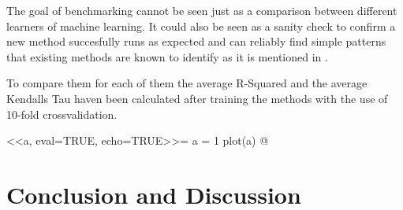 \documentclass[a4paper]{article}
\begin{document}
The goal of benchmarking cannot be seen just as a comparison between different learners of machine learning.
It could also be seen as a sanity check to confirm a new method succesfully runs as expected and can reliably find simple patterns that existing methods are known to identify as it is mentioned in \citet{Hastie2009}. 

To compare them for each of them the average R-Squared and the average Kendalls Tau haven been calculated after training the methods with the use of 10-fold crossvalidation.


<<a, eval=TRUE, echo=TRUE>>=
  a = 1
  plot(a)
@

\section{Conclusion and Discussion}
\label{sec:conclusion}

\FloatBarrier


\end{document}
